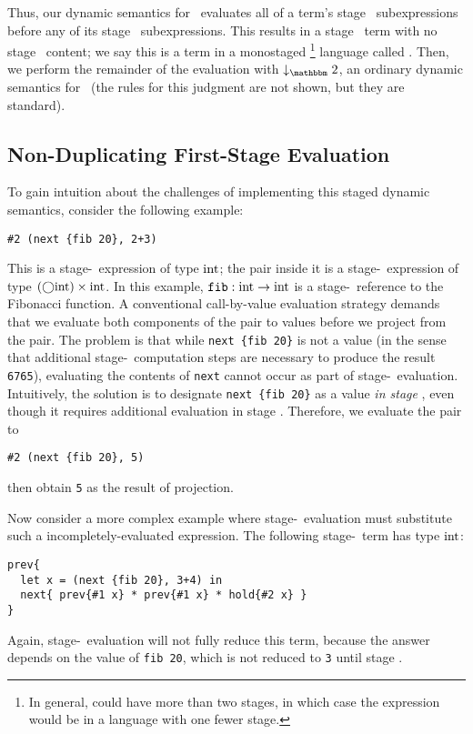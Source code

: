 Thus, our dynamic semantics for \lang\ evaluates all of a term's stage \bbone\
subexpressions before any of its stage \bbtwo\ subexpressions. This results in a
stage \bbtwo\ term with no stage \bbone\ content; we say this is a term in a
monostaged
\footnote{In general, \lang could have more than two stages, in which case the
expression would be in a language with one fewer stage.}
language called \langTwo. Then, we perform the remainder of the evaluation with 
$\tworedsym$, an ordinary dynamic semantics for \langTwo\ (the rules for this
judgment are not shown, but they are standard).

\subsection{Non-Duplicating First-Stage Evaluation}

To gain intuition about the challenges of implementing this staged dynamic
semantics, consider the following example:
\begin{lstlisting}
#2 (next {fib 20}, 2+3)
\end{lstlisting}
This is a stage-\bbone\ expression of type ${\rm int}$; the pair inside it is a
stage-\bbone\ expression of type $(\bigcirc{\rm int})\times{\rm int}$. 
In this example, ${\tt fib} : {\rm int} \to {\rm int}$ is a stage-\bbtwo\ reference to the Fibonacci function.
A conventional call-by-value evaluation strategy demands that we evaluate both components of
the pair to values before we project from the pair. The problem is that
while \verb|next {fib 20}| is not a value (in the sense that additional
stage-\bbtwo\ computation steps are necessary to produce the result \verb|6765|), 
evaluating the contents of \verb|next| cannot occur as part of stage-\bbone\ evaluation.
Intuitively, the solution is to designate \verb|next {fib 20}| as a value \emph{in
stage \bbone}, even though it requires additional evaluation in stage \bbtwo.
Therefore, we evaluate the pair to
\begin{lstlisting}
#2 (next {fib 20}, 5)
\end{lstlisting}
then obtain \verb|5| as the result of projection.

Now consider a more complex example where 
stage-\bbone\ evaluation must substitute such a incompletely-evaluated
expression. The following stage-\bbtwo\ term has type ${\rm int}$:
\begin{lstlisting} 
prev{
  let x = (next {fib 20}, 3+4) in
  next{ prev{#1 x} * prev{#1 x} * hold{#2 x} }
}
\end{lstlisting}
Again, stage-\bbone\ evaluation will not fully reduce this term, because the answer
depends on the value of \verb|fib 20|, which is not reduced to \verb|3| until
stage \bbtwo.

